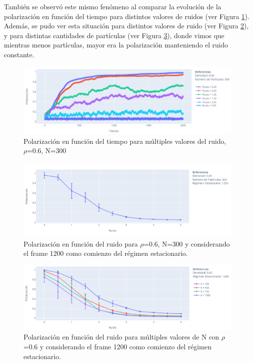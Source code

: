 \documentclass[12pt, a4paper]{report}
\begin{document}
También se observó este mismo fenómeno al comparar la evolución de la polarización en función del tiempo para distintos valores de ruidos (ver Figura \ref{fig:noise_pola_vs_time_multiple_n}). \\

Además, se pudo ver esta situación para distintos valores de ruido (ver Figura \ref{fig:pola_vs_noise}), y para distintas cantidades de partículas (ver Figura \ref{fig:pola_vs_noise_multiple_n}), donde vimos que mientras menos partículas, mayor era la polarización manteniendo el ruido constante.

\pagebreak
\begin{figure}[h]
\includegraphics[scale=0.45]{noise_pola_vs_time_multiple_n.png}
\centering 
\caption{Polarización en función del tiempo para múltiples valores del ruido, $\rho$=0.6, N=300 }
\label{fig:noise_pola_vs_time_multiple_n}
\end{figure}

\begin{figure}[h!]
\includegraphics[scale=0.5]{pola_vs_noise.png}
\centering 
\caption{Polarización en función del ruido para $\rho$=0.6, N=300 y considerando el frame 1200 como comienzo del régimen estacionario.}
\label{fig:pola_vs_noise}
\end{figure}
 
\begin{figure}[h!]
\includegraphics[scale=0.5]{pola_vs_noise_multiple_n.png}
\centering 
\caption{Polarización en función del ruido para múltiples valores de N con $\rho$=0.6 y considerando el frame 1200 como comienzo del régimen estacionario.}
\label{fig:pola_vs_noise_multiple_n}
\end{figure}
\end{document}

